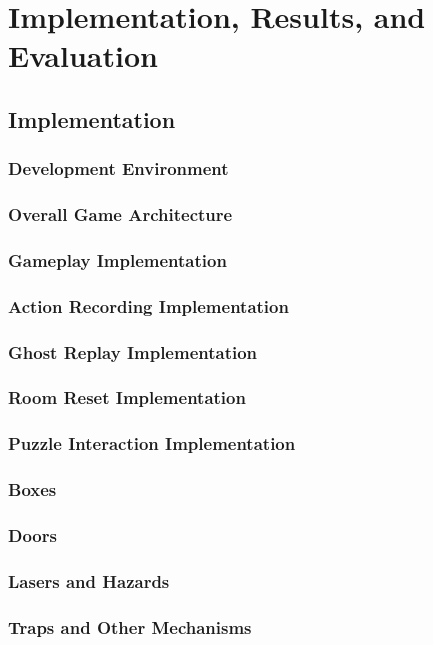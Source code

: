 \section{Implementation, Results, and Evaluation}

\subsection{Implementation}
\subsubsection{Development Environment}
\subsubsection{Overall Game Architecture}
\subsubsection{Gameplay Implementation}
\subsubsection{Action Recording Implementation}
\subsubsection{Ghost Replay Implementation}
\subsubsection{Room Reset Implementation}
\subsubsection{Puzzle Interaction Implementation}
\subsubsection{Boxes}
\subsubsection{Doors}
\subsubsection{Lasers and Hazards}
\subsubsection{Traps and Other Mechanisms}
